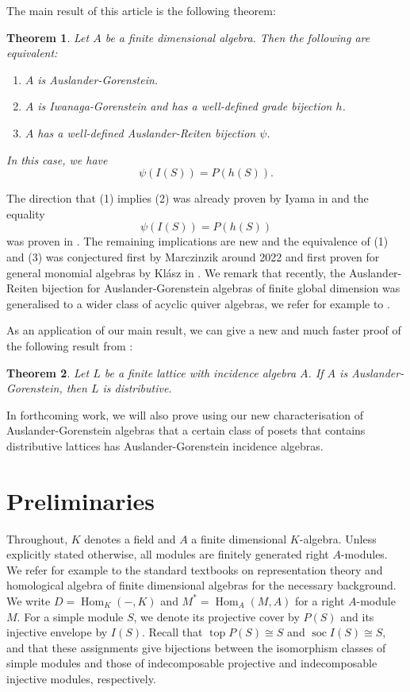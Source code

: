 \documentclass[a4paper]{amsart}
\newtheorem{theorem}{Theorem}[section]
\theoremstyle{definition}
\theoremstyle{remark}
\numberwithin{equation}{section}
\newcommand{\Hom}{\operatorname{Hom}}
\renewcommand{\top}{\operatorname{\mathrm{top}}}
\newcommand{\soc}{\operatorname{\mathrm{soc}}}
\begin{document}
The main result of this article is the following theorem:
\begin{theorem}
Let $A$ be a finite dimensional algebra. Then the following are equivalent:
\begin{enumerate}
    \item $A$ is Auslander-Gorenstein.
    \item $A$ is Iwanaga-Gorenstein and has a well-defined grade bijection $h$.
    \item $A$ has a well-defined Auslander-Reiten bijection $\psi$.
\end{enumerate}
In this case, we have 
\begin{equation*}
 \psi(I(S))=P(h(S)).
\end{equation*}
\end{theorem}
The direction that (1) implies (2) was already proven by Iyama in \cite{I2} and the equality \begin{equation*}
 \psi(I(S))=P(h(S))
\end{equation*} was proven in \cite{KMT}. The remaining implications are new and the equivalence of (1) and (3) was conjectured first by Marczinzik around 2022 \cite[Conjecture 1.2.4]{KM} and first proven for general monomial algebras by Kl\'asz in \cite{K}. 
We remark that recently, the Auslander-Reiten bijection for Auslander-Gorenstein algebras of finite global dimension was generalised to a wider class of acyclic quiver algebras, we refer for example to \cite{D+,KMT,KKM}.


As an application of our main result, we can give a new and much faster proof of the following result from \cite{IM}:
\begin{theorem}
Let $L$ be a finite lattice with incidence algebra $A$. If $A$ is Auslander-Gorenstein, then $L$ is distributive.
\end{theorem}
In forthcoming work, we will also prove using our new characterisation of Auslander-Gorenstein algebras 
that a certain class of posets that contains distributive lattices has Auslander-Gorenstein incidence algebras.



\section{Preliminaries}

Throughout, $K$ denotes a field and $A$ a finite dimensional $K$-algebra. Unless explicitly stated otherwise, all modules are finitely generated right $A$-modules. We refer for example to the standard textbooks \cite{ARS,ASS,Ben,Kr,SY} on representation theory and homological algebra of finite dimensional algebras for the necessary background. We write $D=\Hom_K(-,K)$ and $M^*=\Hom_A(M,A)$ for a right $A$-module $M$. For a simple module $S$, we denote its projective cover by $P(S)$ and its injective envelope by $I(S)$. Recall that $\top P(S)\cong S$ and $\soc I(S)\cong S$, and that these assignments give bijections between the isomorphism classes of simple modules and those of indecomposable projective and indecomposable injective modules, respectively.
\end{document}
